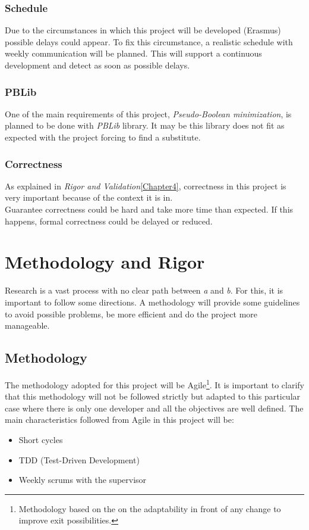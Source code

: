 \subsubsection{Schedule}
Due to the circumstances in which this project will be developed (Erasmus) possible delays could appear. To fix this circumstance, a realistic schedule with weekly communication will be planned. This will support a continuous development and detect as soon as possible delays. 

\subsubsection{PBLib}
One of the main requirements of this project, \emph{Pseudo-Boolean minimization}, is planned to be done with \emph{PBLib} library. It may be this library does not fit as expected with the project forcing to find a substitute. 

\subsubsection{Correctness}
As explained in \emph{Rigor and Validation}\ref{Chapter4}, correctness in this project is very important because of the context it is in. \\
Guarantee correctness could be hard and take more time than expected. If this happens, formal correctness could be delayed or reduced. 

\section{Methodology and Rigor}
Research is a vast process with no clear path between \emph{a} and \emph{b}. For this, it is important to follow some directions. A methodology will provide some guidelines to avoid possible problems, be more efficient and do the project more manageable. 

\subsection{Methodology}
The methodology adopted for this project will be Agile\footnote{Methodology based on the on the adaptability in front of any change to improve exit possibilities.}. It is important to clarify that this methodology will not be followed strictly but adapted to this particular case where there is only one developer and all the objectives are well defined. The main characteristics followed from Agile in this project will be:
\begin{itemize}
	\item Short cycles
	\item TDD (Test-Driven Development)
	\item Weekly scrums with the supervisor
\end{itemize}

